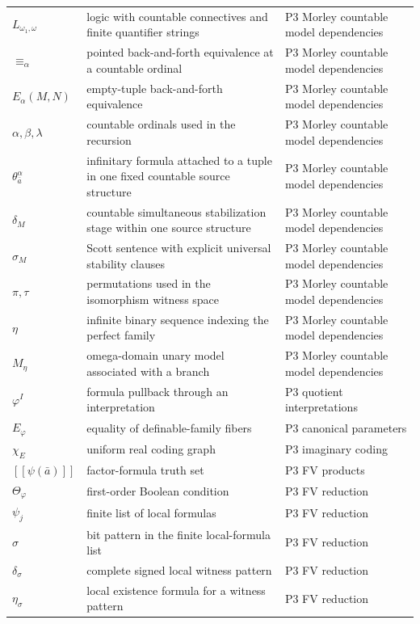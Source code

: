 \begin{longtable}{@{}p{}p{}p{}@{}}
\(L_{\omega_1,\omega}\) & logic with countable connectives and finite quantifier strings & P3 Morley countable model dependencies \\
\(\equiv_\alpha\) & pointed back-and-forth equivalence at a countable ordinal & P3 Morley countable model dependencies \\
\(E_\alpha(M,\allowbreak N)\) & empty-tuple back-and-forth equivalence & P3 Morley countable model dependencies \\
\(\alpha,\allowbreak \beta,\allowbreak \lambda\) & countable ordinals used in the recursion & P3 Morley countable model dependencies \\
\(\theta_{\bar a}^{\alpha}\) & infinitary formula attached to a tuple in one fixed countable source structure & P3 Morley countable model dependencies \\
\(\delta_M\) & countable simultaneous stabilization stage within one source structure & P3 Morley countable model dependencies \\
\(\sigma_M\) & Scott sentence with explicit universal stability clauses & P3 Morley countable model dependencies \\
\(\pi,\allowbreak \tau\) & permutations used in the isomorphism witness space & P3 Morley countable model dependencies \\
\(\eta\) & infinite binary sequence indexing the perfect family & P3 Morley countable model dependencies \\
\(M_\eta\) & omega-domain unary model associated with a branch & P3 Morley countable model dependencies \\
\(\varphi^I\) & formula pullback through an interpretation & P3 quotient interpretations \\
\(E_\varphi\) & equality of definable-family fibers & P3 canonical parameters \\
\(\chi_E\) & uniform real coding graph & P3 imaginary coding \\
\([\![\psi(\bar a)]\!]\) & factor-formula truth set & P3 FV products \\
\(\Theta_\varphi\) & first-order Boolean condition & P3 FV reduction \\
\(\psi_j\) & finite list of local formulas & P3 FV reduction \\
\(\sigma\) & bit pattern in the finite local-formula list & P3 FV reduction \\
\(\delta_\sigma\) & complete signed local witness pattern & P3 FV reduction \\
\(\eta_\sigma\) & local existence formula for a witness pattern & P3 FV reduction \\

\end{longtable}
